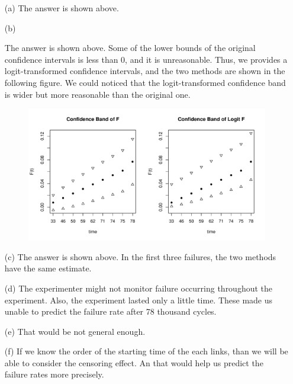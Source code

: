 \documentclass[paper=a4, fontsize=12pt]{scrartcl} %
\numberwithin{equation}{section} %
\numberwithin{figure}{section} %
\numberwithin{table}{section} %
\begin{document}
\begin{itemize}
	
	\item[(a)]{
		The answer is shown above.
	}
	
	\item[(b)]{
		The answer is shown above. Some of the lower bounds of the original confidence intervals is less than 0, and it is unreasonable. Thus, we provides a logit-transformed confidence intervals, and the two methods are shown in the following figure. We could noticed that the logit-transformed confidence band is wider but more reasonable than the original one. \\
	\newpage	
		\begin{figure}[h]
			\includegraphics[width = 6 in]{3_4_b.pdf}
		\end{figure}
	}

	\item[(c)]{
		The answer is shown above. In the first three failures, the two methods have the same estimate.
	}
	
	\item[(d)]{
		The experimenter might not monitor failure occurring throughout the experiment. Also, the experiment lasted only a little time. These made us unable to predict the failure rate after 78 thousand cycles.
	}
	
	\item[(e)]{
		That would be not general enough. 
	}
	
	\item[(f)]{
		If we know the order of the starting time of the each links, than we will be able to consider the censoring effect. An that would help us predict the failure rates more precisely.
	}
\end{itemize}
\end{document}
